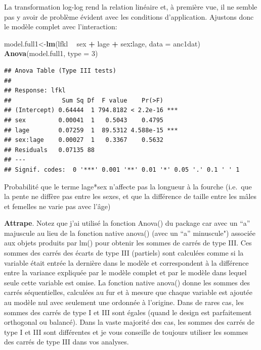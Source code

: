 \documentclass[12pt,]{book}
\newenvironment{Shaded}{\begin{snugshade}}{\end{snugshade}}
\newcommand{\DataTypeTok}[1]{\textcolor[rgb]{0.13,0.29,0.53}{#1}}
\newcommand{\DecValTok}[1]{\textcolor[rgb]{0.00,0.00,0.81}{#1}}
\newcommand{\KeywordTok}[1]{\textcolor[rgb]{0.13,0.29,0.53}{\textbf{#1}}}
\newcommand{\NormalTok}[1]{#1}
\newcommand{\OperatorTok}[1]{\textcolor[rgb]{0.81,0.36,0.00}{\textbf{#1}}}
\newcommand{\StringTok}[1]{\textcolor[rgb]{0.31,0.60,0.02}{#1}}
\begin{document}
La transformation log-log rend la relation linéaire et, à première vue, il ne semble pas y avoir de problème évident avec les conditions d'application. Ajustons donc le modèle complet avec l'interaction:

\begin{Shaded}
\begin{Highlighting}[]
\NormalTok{model.full1<-}\KeywordTok{lm}\NormalTok{(lfkl }\OperatorTok{~}\StringTok{ }\NormalTok{sex }\OperatorTok{+}\StringTok{ }\NormalTok{lage }\OperatorTok{+}\StringTok{ }\NormalTok{sex}\OperatorTok{:}\NormalTok{lage, }\DataTypeTok{data =}\NormalTok{ anc1dat)}
\KeywordTok{Anova}\NormalTok{(model.full1, }\DataTypeTok{type =} \DecValTok{3}\NormalTok{)}
\end{Highlighting}
\end{Shaded}

\begin{verbatim}
## Anova Table (Type III tests)
## 
## Response: lfkl
##              Sum Sq Df  F value    Pr(>F)    
## (Intercept) 0.64444  1 794.8182 < 2.2e-16 ***
## sex         0.00041  1   0.5043    0.4795    
## lage        0.07259  1  89.5312 4.588e-15 ***
## sex:lage    0.00027  1   0.3367    0.5632    
## Residuals   0.07135 88                       
## ---
## Signif. codes:  0 '***' 0.001 '**' 0.01 '*' 0.05 '.' 0.1 ' ' 1
\end{verbatim}

Probabilité que le terme lage*sex n'affecte pas la longueur à la fourche (i.e.~que la pente ne diffère pas entre les sexes, et que la différence de taille entre les mâles et femelles ne varie pas avec l'âge)

\textbf{Attrape}. Notez que j'ai utilisé la fonction Anova() du package car avec un ``a'' majuscule au lieu de la fonction native anova() (avec un ``a'' minuscule") associée aux objets produits par lm() pour obtenir les sommes de carrés de type III. Ces sommes des carrés des écarts de type III (partiels) sont calculées comme si la variable était entrée la dernière dans le modèle et correspondent à la différence entre la variance expliquée par le modèle complet et par le modèle dans lequel seule cette variable est omise. La fonction native anova() donne les sommes des carrés séquentielles, calculées au fur et à mesure que chaque variable est ajoutée au modèle nul avec seulement une ordonnée à l'origine. Dans de rares cas, les sommes des carrés de type I et III sont égales (quand le design est parfaitement orthogonal ou balancé). Dans la vaste majorité des cas, les sommes des carrés de type I et III sont différentes et je vous conseille de toujours utiliser les sommes des carrés de type III dans vos analyses.
\end{document}
